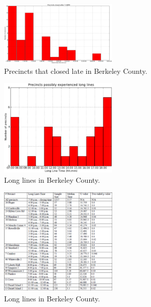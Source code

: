\documentclass[letterpaper,twocolumn,10pt]{article}
\begin{document}
\begin{figure}[htbp]
\begin{center}
    \includegraphics[width=0.5\textwidth,height=0.3\textheight]{berkeleyopenlate.eps}
\end{center}
\caption{Precincts that closed late in Berkeley County.}
\label{fig:precincts-closed-late}
\end{figure}

\begin{figure}[htbp]
\begin{center}
    \includegraphics[width=0.5\textwidth,height=0.3\textheight]{berkeleyLongLine.eps}
\end{center}
\caption{Long lines in Berkeley County.}
\label{fig:long-lines}
\end{figure}

\begin{figure}[htbp]
\begin{center}
    \includegraphics[width=0.5\textwidth,height=0.4\textheight]{berkeleyLongLineTable.eps}
\end{center}
\caption{Long lines in Berkeley County.}
\label{fig:mann-whitney-u}
\end{figure}
\end{document}
